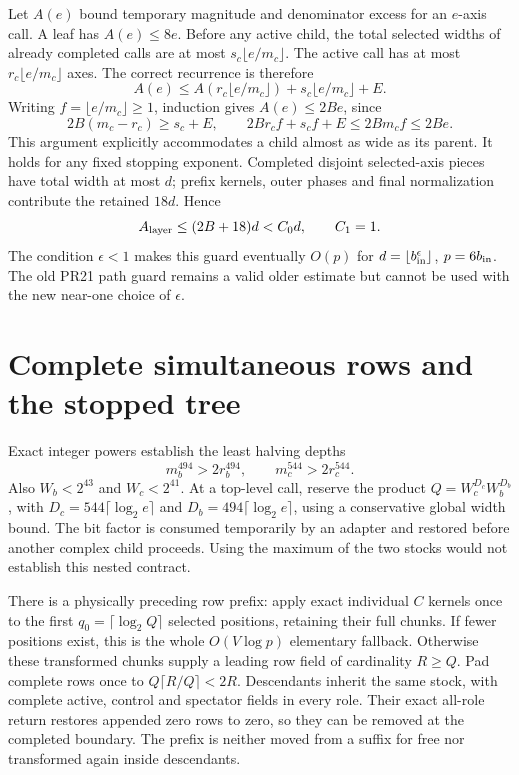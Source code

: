 \documentclass[11pt]{article}
\begin{document}
Let $A(e)$ bound temporary magnitude and denominator excess for an
$e$-axis call. A leaf has $A(e)\le8e$. Before any active child, the total
selected widths of already completed calls are at most
$s_c\lfloor e/m_c\rfloor$. The active call has at most
$r_c\lfloor e/m_c\rfloor$ axes. The correct recurrence is therefore
\[
 A(e)\le A(r_c\lfloor e/m_c\rfloor)
              +s_c\lfloor e/m_c\rfloor+E.
\]
Writing $f=\lfloor e/m_c\rfloor\ge1$, induction gives $A(e)\le2Be$,
since
\[
 2B(m_c-r_c)\ge s_c+E,
 \qquad 2Br_cf+s_cf+E\le2Bm_cf\le2Be.
\]
This argument explicitly accommodates a child almost as wide as its parent.
It holds for any fixed stopping exponent. Completed disjoint selected-axis
pieces have total width at most $d$; prefix kernels, outer phases and final
normalization contribute the retained $18d$. Hence
\[
 A_{\rm layer}\le(2B+18)d<C_0d,\qquad C_1=1.
\]
The condition $\epsilon<1$ makes this guard eventually $O(p)$ for
$d=\lfloor b_{\rm in}^{\epsilon}\rfloor$, $p=6b_{\rm in}$.
The old PR21 path guard remains a valid older estimate but cannot be
used with the new near-one choice of $\epsilon$.

\section{Complete simultaneous rows and the stopped tree}
Exact integer powers establish the least halving depths
\[
 m_b^{494}>2r_b^{494},\qquad m_c^{544}>2r_c^{544}.
\]
Also $W_b<2^{43}$ and $W_c<2^{41}$. At a top-level call, reserve the
product $Q=W_c^{D_c}W_b^{D_b}$, with
$D_c=544\lceil\log_2 e\rceil$ and
$D_b=494\lceil\log_2 e\rceil$, using a conservative global width bound.
The bit factor is consumed temporarily by an adapter and restored before
another complex child proceeds. Using the maximum of the two stocks
would not establish this nested contract.

There is a physically preceding row prefix: apply exact individual $C$
kernels once to the first $q_0=\lceil\log_2 Q\rceil$ selected positions,
retaining their full chunks. If fewer positions exist, this is the whole
$O(V\log p)$ elementary fallback. Otherwise these transformed chunks
supply a leading row field of cardinality $R\ge Q$. Pad complete rows
once to $Q\lceil R/Q\rceil<2R$. Descendants inherit the same stock,
with complete active, control and spectator fields in every role.
Their exact all-role return restores appended zero rows to zero, so they
can be removed at the completed boundary. The prefix is neither moved
from a suffix for free nor transformed again inside descendants.
\end{document}
